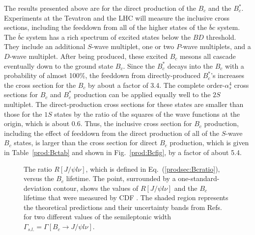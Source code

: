The results presented above are for the direct production of the $B_c$
and the $B_c^*$. Experiments at the Tevatron and the LHC will measure
the inclusive cross sections, including the feeddown from all of the
higher states of the $\bar b c$ system. The $\bar b c$ system has a rich
spectrum of excited states below the $B D$ threshold.  They include an
additional $S$-wave  multiplet, one or two $P$-wave multiplets, and a
$D$-wave multiplet. After being produced, these excited $B_c$ mesons all
cascade eventually down to the ground state $B_c$. Since the $B_c^*$
decays into the $B_c$ with a probability of almost 100\%, the feeddown
from directly-produced $B_c^*$'s increases the cross section for the
$B_c$ by about a factor of 3.4. The complete order-$\alpha_s^4$ cross
sections for $B_c$ and $B_c^*$ production can be applied equally well to
the $2S$ multiplet. The direct-production cross sections for these
states are smaller than those for the $1S$ states by the ratio of the
squares of the wave functions at the origin, which is about 0.6. Thus,
the inclusive cross section for $B_c$ production, including the effect
of feeddown from the direct production of all of the $S$-wave  $B_c$
states, is larger than the cross section for direct $B_c$ production,
which is given in Table~\ref{prod:Bctab} and shown in
Fig.~\ref{prod:Bcfig}, by a factor of about 5.4. 

\begin{figure}[htb]
\begin{center}
\caption{The ratio $R[J/\psi l\nu]$, which is defined in 
Eq.~(\ref{prodsec:Bcratio}), versus the $B_c$ lifetime.
The point, surrounded by a one-standard-deviation contour, shows the
values of $R[J/\psi l\nu]$ and the $B_c$ lifetime 
that were measured by CDF \cite{Abe:1998wi,Abe:1998fb}.
The shaded region represents the theoretical predictions and their
uncertainty bands from Refs.~\cite{Lusignoli1,Scora} for two different
values of the semileptonic width $\Gamma_{s.l.} = \Gamma[B_c \rightarrow
J/\psi l \nu]$. }
\label{fig-bcxsec_cdf}
\end{center}
\end{figure}


